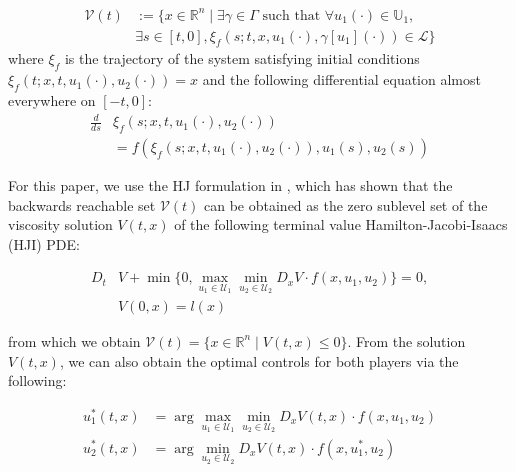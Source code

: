 \begin{equation}
\begin{aligned}
\mathcal{V}(t) &:= \{x\in\mathbb{R}^n \mid \exists \gamma\in\Gamma \text{ such that } \forall u_1(\cdot)\in\mathbb{U}_1, \\
&\exists s \in [t,0], \xi_f(s; t, x, u_1(\cdot), \gamma[u_1](\cdot)) \in \mathcal{L} \}
\end{aligned}
\end{equation}
where $\xi_f$ is the trajectory of the system satisfying initial conditions $\xi_f(t; x, t, u_1(\cdot), u_2(\cdot))=x$ and the following differential equation almost everywhere on $[-t, 0]$:
\begin{equation}
\begin{aligned}
\frac{d}{ds}&\xi_f(s; x, t, u_1(\cdot), u_2(\cdot)) \\
&= f(\xi_f(s; x, t, u_1(\cdot), u_2(\cdot)), u_1(s), u_2(s))
\end{aligned}
\end{equation}

For this paper, we use the HJ formulation in \cite{Mitchell05}, which has shown that the backwards reachable set $\mathcal{V}(t)$ can be obtained as the zero sublevel set of the viscosity solution \cite{Crandall84} $V(t,x)$ of the following terminal value Hamilton-Jacobi-Isaacs (HJI) PDE:

\begin{equation} \label{eq:HJIPDE}
\begin{aligned}
D_t &V +\min \{0, \max_{u_1\in\mathcal{U}_1} \min_{u_2\in\mathcal{U}_2} D_x V \cdot f(x,u_1,u_2) \} = 0, \\
&V(0,x) = l(x)
\end{aligned}
\end{equation}

\noindent from which we obtain $\mathcal{V}(t) = \{x\in\mathbb{R}^n \mid V(t,x)\le 0\}$. From the solution $V(t,x)$, we can also obtain the optimal controls for both players via the following:

\begin{equation} \label{eq:HJI_ctrl_syn}
\begin{aligned}
u_1^*(t,x) &= \arg \max_{u_1\in\mathcal{U}_1} \min_{u_2\in\mathcal U_2} D_x V(t,x) \cdot f(x,u_1,u_2)\\
u_2^*(t,x) &= \arg \min_{u_2\in\mathcal{U}_2} D_x V(t,x) \cdot f(x,u_1^*,u_2)
\end{aligned}
\end{equation}

